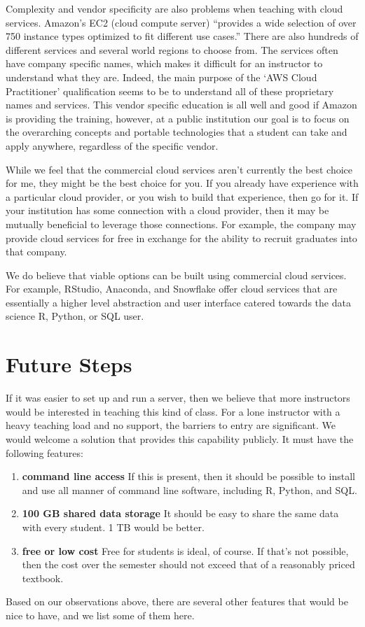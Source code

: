 \documentclass[12pt]{article}
\begin{document}
Complexity and vendor specificity are also problems when teaching with cloud services.
Amazon's EC2 (cloud compute server) ``provides a wide selection of over 750 instance types optimized to fit different use cases.''
There are also hundreds of different services and several world regions to choose from.
The services often have company specific names, which makes it difficult for an instructor to understand what they are.
Indeed, the main purpose of the `AWS Cloud Practitioner' qualification seems to be to understand all of these proprietary names and services.
This vendor specific education is all well and good if Amazon is providing the training, however, at a public institution our goal is to focus on the overarching concepts and portable technologies that a student can take and apply anywhere, regardless of the specific vendor.

While we feel that the commercial cloud services aren't currently the best choice for me, they might be the best choice for you.
If you already have experience with a particular cloud provider, or you wish to build that experience, then go for it.
If your institution has some connection with a cloud provider, then it may be mutually beneficial to leverage those connections.
For example, the company may provide cloud services for free in exchange for the ability to recruit graduates into that company.

We do believe that viable options can be built using commercial cloud services.
For example, RStudio, Anaconda, and Snowflake offer cloud services that are essentially a higher level abstraction and user interface catered towards the data science R, Python, or SQL user.

\section{Future Steps}

If it was easier to set up and run a server, then we believe that more instructors would be interested in teaching this kind of class.
For a lone instructor with a heavy teaching load and no support, the barriers to entry are significant.
We would welcome a solution that provides this capability publicly.
It must have the following features:
\begin{enumerate}
\item \textbf{command line access} If this is present, then it should be possible to install and use all manner of command line software, including R, Python, and SQL.
\item \textbf{100 GB shared data storage} It should be easy to share the same data with every student.
    1 TB would be better.
\item \textbf{free or low cost} Free for students is ideal, of course.
    If that's not possible, then the cost over the semester should not exceed that of a reasonably priced textbook.
\end{enumerate}
Based on our observations above, there are several other features that would be nice to have, and we list some of them here.
\end{document}
